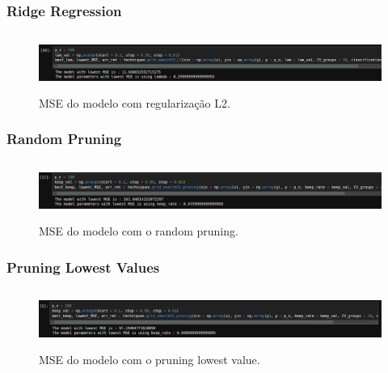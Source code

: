\documentclass{article}
\begin{document}
\subsubsection*{Ridge Regression}

\vspace{25pt}

\begin{figure}[h]

    \centering
    \includegraphics[height=0.75in]{MSE_l2_boston.png}
    \caption{MSE do modelo com regularização L2.}
    \label{fig:example}
    
\end{figure}

\subsubsection*{Random Pruning}

\vspace{25pt}

\begin{figure}[h]

    \centering
    \includegraphics[height=0.75in]{MSE_random_prun_boston.png}
    \caption{MSE do modelo com o random pruning.}
    \label{fig:example}
    
\end{figure}

\newpage

\subsubsection*{Pruning Lowest Values}

\vspace{25pt}

\begin{figure}[h]

    \centering
    \includegraphics[height=0.75in]{MSE_prun_lv.png}
    \caption{MSE do modelo com o pruning lowest value.}
    \label{fig:example}
    
\end{figure}
\end{document}
